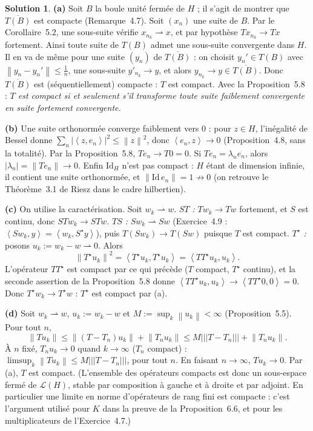\documentclass[11pt,a4paper]{article}
\newcommand{\adh}[1]{\overline{#1}}
\newcommand{\norm}[1]{\left\|#1\right\|}
\newcommand{\opnorm}[1]{|\!|\!|#1|\!|\!|}
\newcommand{\ps}[2]{\left\langle #1,#2\right\rangle}
\newcommand{\Lc}{\mathcal{L}}
\newcommand{\wk}{\rightharpoonup}
\theoremstyle{definition}
\newtheorem*{solution}{Solution}
\begin{document}
\begin{solution}
\noindent\textbf{(a)} Soit $B$ la boule unité fermée de $H$ ; il s'agit de montrer que $\adh{T(B)}$ est compacte (Remarque~4.7). Soit $(x_n)$ une suite de $B$. Par le Corollaire~5.2, une sous-suite vérifie $x_{n_k}\wk x$, et par hypothèse $Tx_{n_k}\to Tx$ fortement. Ainsi toute suite de $T(B)$ admet une sous-suite convergente dans $H$. Il en va de même pour une suite $(y_n)$ de $\adh{T(B)}$ : on choisit $y_n'\in T(B)$ avec $\norm{y_n-y_n'}\le\frac1n$, une sous-suite $y'_{n_k}\to y$, et alors $y_{n_k}\to y\in\adh{T(B)}$. Donc $\adh{T(B)}$ est (séquentiellement) compacte : $T$ est compact. Avec la Proposition~5.8 : \emph{$T$ est compact si et seulement s'il transforme toute suite faiblement convergente en suite fortement convergente.}

\medskip
\noindent\textbf{(b)} Une suite orthonormée converge faiblement vers $0$ : pour $z\in H$, l'inégalité de Bessel donne $\sum_n|\ps z{e_n}|^2\le\norm z^2$, donc $\ps{e_n}z\to0$ (Proposition~4.8, sans la totalité). Par la Proposition~5.8, $Te_n\to T0=0$. Si $Te_n=\lambda_ne_n$, alors $|\lambda_n|=\norm{Te_n}\to0$. Enfin $\mathrm{Id}_H$ n'est pas compact : $H$ étant de dimension infinie, il contient une suite orthonormée, et $\norm{\mathrm{Id}\,e_n}=1\not\to0$ (on retrouve le Théorème~3.1 de Riesz dans le cadre hilbertien).

\medskip
\noindent\textbf{(c)} On utilise la caractérisation. Soit $w_k\wk w$. \emph{$ST$ :} $Tw_k\to Tw$ fortement, et $S$ est continu, donc $STw_k\to STw$. \emph{$TS$ :} $Sw_k\wk Sw$ (Exercice~4.9 : $\ps{Sw_k}y=\ps{w_k}{S^\star y}$), puis $T(Sw_k)\to T(Sw)$ puisque $T$ est compact. \emph{$T^\star$ :} posons $u_k:=w_k-w\wk0$. Alors
\[
\norm{T^\star u_k}^2=\ps{T^\star u_k}{T^\star u_k}=\ps{TT^\star u_k}{u_k}.
\]
L'opérateur $TT^\star$ est compact par ce qui précède ($T$ compact, $T^\star$ continu), et la seconde assertion de la Proposition~5.8 donne $\ps{TT^\star u_k}{u_k}\to\ps{TT^\star0}0=0$. Donc $T^\star w_k\to T^\star w$ : $T^\star$ est compact par (a).

\medskip
\noindent\textbf{(d)} Soit $w_k\wk w$, $u_k:=w_k-w$ et $M:=\sup_k\norm{u_k}<\infty$ (Proposition~5.5). Pour tout $n$,
\[
\norm{Tu_k}\le\norm{(T-T_n)u_k}+\norm{T_nu_k}\le M\opnorm{T-T_n}+\norm{T_nu_k}.
\]
À $n$ fixé, $T_nu_k\to0$ quand $k\to\infty$ ($T_n$ compact) : $\limsup_k\norm{Tu_k}\le M\opnorm{T-T_n}$, pour tout $n$. En faisant $n\to\infty$, $Tu_k\to0$. Par (a), $T$ est compact. (L'ensemble des opérateurs compacts est donc un sous-espace fermé de $\Lc(H)$, stable par composition à gauche et à droite et par adjoint. En particulier une limite en norme d'opérateurs de rang fini est compacte : c'est l'argument utilisé pour $K$ dans la preuve de la Proposition~6.6, et pour les multiplicateurs de l'Exercice~4.7.)


\end{solution}
\end{document}
